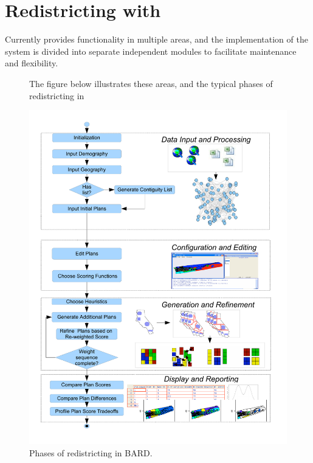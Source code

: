 \documentclass[article]{JSSstyle/jss}
\begin{document}
\section[Redistricting with BARD]{Redistricting with }

Currently  provides functionality in multiple areas, and the implementation of the  system is divided into separate independent modules to facilitate maintenance and flexibility.

\begin{figure}[!h]
The figure below illustrates these areas, and the typical phases of redistricting in  

  \begin{center}
    \includegraphics[page=1]{bardiagram.pdf}
  \end{center}

  \caption{\small Phases of redistricting in BARD.}
  \label{fig:barddiagram}
\end{figure}
\end{document}
